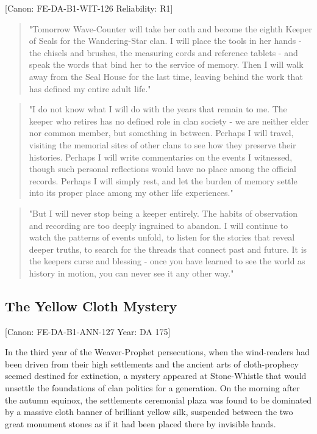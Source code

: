 {[}Canon: FE-DA-B1-WIT-126 \textbar{} Reliability: R1{]}

\begin{quote}
"Tomorrow Wave-Counter will take her oath and become the eighth Keeper
of Seals for the Wandering-Star clan. I will place the tools in her
hands - the chisels and brushes, the measuring cords and reference
tablets - and speak the words that bind her to the service of memory.
Then I will walk away from the Seal House for the last time, leaving
behind the work that has defined my entire adult life."
\end{quote}

\begin{quote}
"I do not know what I will do with the years that remain to me. The
keeper who retires has no defined role in clan society - we are neither
elder nor common member, but something in between. Perhaps I will
travel, visiting the memorial sites of other clans to see how they
preserve their histories. Perhaps I will write commentaries on the
events I witnessed, though such personal reflections would have no place
among the official records. Perhaps I will simply rest, and let the
burden of memory settle into its proper place among my other life
experiences."
\end{quote}

\begin{quote}
"But I will never stop being a keeper entirely. The habits of
observation and recording are too deeply ingrained to abandon. I will
continue to watch the patterns of events unfold, to listen for the
stories that reveal deeper truths, to search for the threads that
connect past and future. It is the keeper\textquotesingle s curse and
blessing - once you have learned to see the world as history in motion,
you can never see it any other way."
\end{quote}

\subsection{The Yellow Cloth Mystery}\label{the-yellow-cloth-mystery}

{[}Canon: FE-DA-B1-ANN-127 \textbar{} Year: DA 175{]}

In the third year of the Weaver-Prophet persecutions, when the
wind-readers had been driven from their high settlements and the ancient
arts of cloth-prophecy seemed destined for extinction, a mystery
appeared at Stone-Whistle that would unsettle the foundations of clan
politics for a generation. On the morning after the autumn equinox, the
settlement\textquotesingle s ceremonial plaza was found to be dominated
by a massive cloth banner of brilliant yellow silk, suspended between
the two great monument stones as if it had been placed there by
invisible hands.


